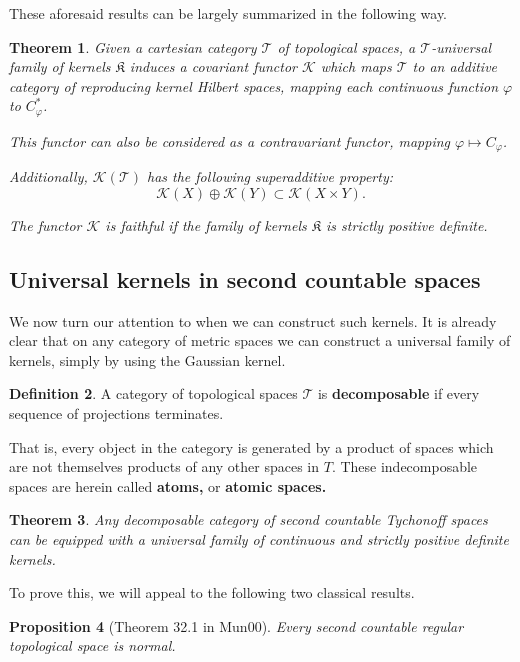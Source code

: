 \documentclass[12pt]{amsart}
\newtheorem{theorem}{Theorem}[section]
\newtheorem{proposition}[theorem]{Proposition}
\theoremstyle{definition}
\newtheorem{definition}[theorem]{Definition}
\numberwithin{equation}{section}
\begin{document}
These aforesaid results can be largely summarized in the following way.

\begin{theorem}
    Given a cartesian category $\mathcal T$ of topological spaces, a $\mathcal T$-universal family of kernels $\mathfrak K$ induces a covariant functor $\mathcal K$ which maps $\mathcal T$ to an additive category of reproducing kernel Hilbert spaces, mapping each continuous function $\varphi$ to $C_\varphi^*$. 

    This functor can also be considered as a contravariant functor, mapping $\varphi \mapsto C_\varphi$. 

    Additionally, $\mathcal K(\mathcal T)$ has the following superadditive property: \[\mathcal K(X) \oplus \mathcal K(Y) \subset \mathcal K(X\times Y).\]

    The functor $\mathcal K$ is faithful if the family of kernels $\mathfrak K$ is strictly positive definite. 
\end{theorem}

\subsection{Universal kernels in second countable spaces}

We now turn our attention to when we can construct such kernels. It is already clear that on any category of metric spaces we can construct a universal family of kernels, simply by using the Gaussian kernel. 

\begin{definition}
    A category of topological spaces $\mathcal T$ is \textbf{decomposable} if every sequence of projections terminates. 

    That is, every object in the category is generated by a product of spaces which are not themselves products of any other spaces in $T$. These indecomposable spaces are herein called \textbf{atoms,} or \textbf{atomic spaces.}
\end{definition}

\begin{theorem}
\label{Tychonoff}
    Any decomposable category of second countable Tychonoff spaces can be equipped with a universal family of continuous and strictly positive definite kernels.  
\end{theorem}

To prove this, we will appeal to the following two classical results.

\begin{proposition}[Theorem 32.1 in Mun00]\label{normal}
    Every second countable regular topological space is normal. 
\end{proposition}
\end{document}
